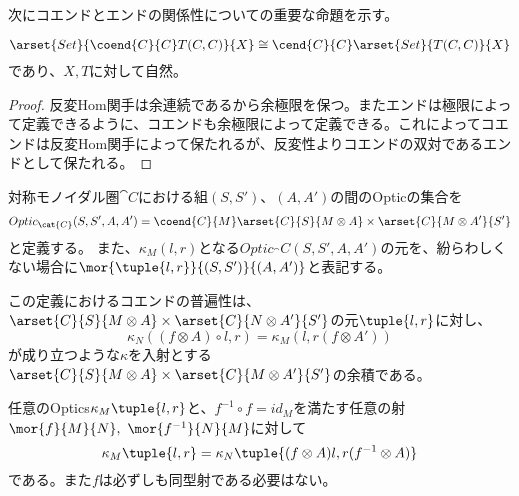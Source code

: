\documentclass[uplatex,dvipdfmx]{jsarticle}
\begin{document}
  次にコエンドとエンドの関係性についての重要な命題を示す。
  \begin{prop}\label{prop-preservation-coend-by-hom-functor}
    \[\arset{Set}{\coend{C}{C} T(C,C)}{X}\cong\cend{C}{C}\arset{Set}{T(C,C)}{X}\]であり、$X,T$に対して自然。
  \end{prop}
  \begin{proof}
    反変Hom関手は余連続であるから余極限を保つ。またエンドは極限によって定義できるように、コエンドも余極限によって定義できる。これによってコエンドは反変Hom関手によって保たれるが、反変性よりコエンドの双対であるエンドとして保たれる。
  \end{proof}
  \begin{define}[Optics]\label{def-optics}
    対称モノイダル圏$\cat{C}$における組$(S,S')$、$(A,A')$の間のOpticの集合を
    \[Optic_\cat{C}(S,S',A,A')=\coend{C}{M}\arset{C}{S}{M\otimes A}\times \arset{C}{M\otimes A'}{S'}\]と定義する。
    また、$\kappa_M(l,r)$となる$Optic_\cat{C}(S,S',A,A')$の元を、紛らわしくない場合に$\mor{\tuple{l,r}}{(S,S')}{(A,A')}$と表記する。
    \begin{center}
    \end{center}
  \end{define}
  この定義におけるコエンドの普遍性は、$\arset{C}{S}{M\otimes A}\times \arset{C}{N\otimes A'}{S'}$の元$\tuple{l,r}$に対し、
  \[\kappa_N((f\otimes A)\circ l, r)=\kappa_M(l, r(f\otimes A'))\]が成り立つような$\kappa$を入射とする$\arset{C}{S}{M\otimes A}\times \arset{C}{M\otimes A'}{S'}$の余積である。

  \begin{prop}
    任意のOptics$\kappa_M\tuple{l,r}$と、$f^{-1}\circ f = id_M$を満たす任意の射$\mor{f}{M}{N},\ \mor{f^{-1}}{N}{M}$に対して\[\kappa_M\tuple{l,r} = \kappa_N\tuple{(f\otimes A)l,r(f^{-1}\otimes A)}\]である。また$f$は必ずしも同型射である必要はない。
  \end{prop}
\end{document}
